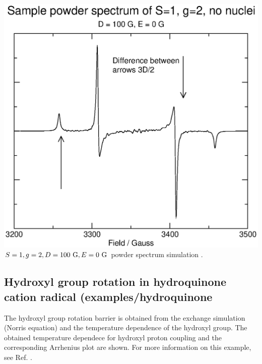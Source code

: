 \documentclass[byrevtex,amssymb,aps,pra,floatfix,letterpaper]{revtex4}
\begin{document}
\begin{center}
\includegraphics*[scale=0.4]{fig16}\\
$S=1, g = 2, D = 100\textnormal{ G}, E = 0\textnormal{ G}$ powder spectrum simulation \cite{bolton}.
\end{center}

\subsection{Hydroxyl group rotation in hydroquinone cation radical (examples/hydroquinone}

The hydroxyl group rotation barrier is obtained from the exchange simulation (Norris equation) and the temperature dependence of the hydroxyl group. The obtained temperature dependece for hydroxyl proton coupling and the corresponding Arrhenius plot are shown. For more information on this example, see Ref. \cite{eloranta}.
\end{document}

